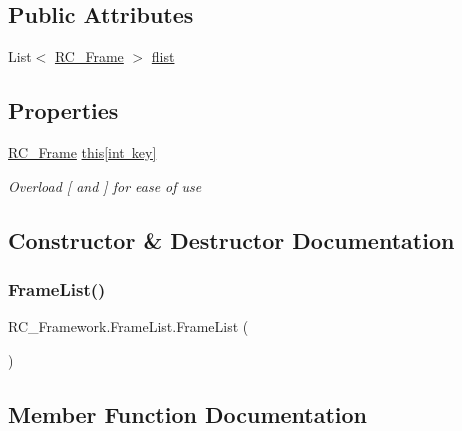 \subsection*{Public Attributes}
\begin{DoxyCompactItemize}
\item 
List$<$ \mbox{\hyperlink{class_r_c___framework_1_1_r_c___frame}{R\+C\+\_\+\+Frame}} $>$ \mbox{\hyperlink{class_r_c___framework_1_1_frame_list_ac79fd51ab4e22a0ac36da0020bb1f148}{flist}}
\end{DoxyCompactItemize}
\subsection*{Properties}
\begin{DoxyCompactItemize}
\item 
\mbox{\hyperlink{class_r_c___framework_1_1_r_c___frame}{R\+C\+\_\+\+Frame}} \mbox{\hyperlink{class_r_c___framework_1_1_frame_list_a7a404a856cc51b13a0ccecbeb07a66be}{this\mbox{[}int key\mbox{]}}}
\begin{DoxyCompactList}\small\item\em Overload \mbox{[} and \mbox{]} for ease of use \end{DoxyCompactList}\end{DoxyCompactItemize}


\subsection{Constructor \& Destructor Documentation}
\mbox{\label{class_r_c___framework_1_1_frame_list_a1c3c1a8575092c34e47a77fc90100d71}} 
\subsubsection{\texorpdfstring{Frame\+List()}{FrameList()}}
{\footnotesize\ttfamily R\+C\+\_\+\+Framework.\+Frame\+List.\+Frame\+List (\begin{DoxyParamCaption}{ }\end{DoxyParamCaption})}



\subsection{Member Function Documentation}
\mbox{\label{class_r_c___framework_1_1_frame_list_a0143dca563006dc8f6c6256cc69a0da2}} 
